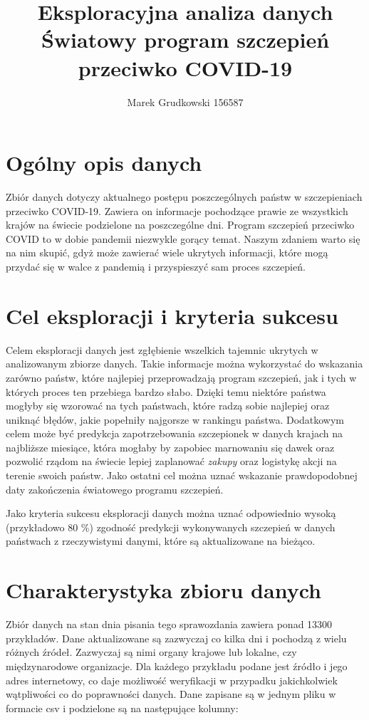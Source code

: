 \documentclass[12pt, oneside, openany]{article}
\title{
	Eksploracyjna analiza danych \\
	Światowy program szczepień przeciwko COVID-19
}
\author{
	Marek Grudkowski 156587
	\\
}
\begin{document}
\maketitle

\section{Ogólny opis danych}

Zbiór danych dotyczy aktualnego postępu poszczególnych państw w szczepieniach przeciwko COVID-19. Zawiera on informacje pochodzące prawie ze wszystkich krajów na świecie podzielone na poszczególne dni. Program szczepień przeciwko COVID to w dobie pandemii niezwykle gorący temat. Naszym zdaniem warto się na nim skupić, gdyż może zawierać wiele ukrytych informacji, które mogą przydać się w walce z pandemią i przyspieszyć sam proces szczepień. 

\section{Cel eksploracji i kryteria sukcesu}

Celem eksploracji danych jest zgłębienie wszelkich tajemnic ukrytych w analizowanym zbiorze danych. Takie informacje można wykorzystać do wskazania zarówno państw, które najlepiej przeprowadzają program szczepień, jak i tych w których proces ten przebiega bardzo słabo. Dzięki temu niektóre państwa mogłyby się wzorować na tych państwach, które radzą sobie najlepiej oraz uniknąć błędów, jakie popełniły najgorsze w rankingu państwa.  Dodatkowym celem może być predykcja zapotrzebowania szczepionek w danych krajach na najbliższe miesiące, która mogłaby by zapobiec marnowaniu się dawek oraz pozwolić rządom na świecie lepiej zaplanować \textit{zakupy} oraz logistykę akcji na terenie swoich państw.  Jako ostatni cel można uznać wskazanie prawdopodobnej daty zakończenia światowego programu szczepień. 
\par
Jako kryteria sukcesu eksploracji danych można uznać odpowiednio wysoką (przykładowo $80$ \%) zgodność predykcji wykonywanych szczepień w danych państwach z rzeczywistymi danymi, które są aktualizowane na bieżąco. 

\newpage

\section{Charakterystyka zbioru danych}
Zbiór danych na stan dnia pisania tego sprawozdania zawiera ponad 13300 przykładów. Dane aktualizowane są zazwyczaj co kilka dni i pochodzą z wielu różnych źródeł. Zazwyczaj są nimi organy krajowe lub lokalne, czy międzynarodowe organizacje. Dla każdego przykładu podane jest źródło i jego adres internetowy, co daje możliwość weryfikacji w przypadku jakichkolwiek wątpliwości co do poprawności danych. Dane zapisane są w jednym pliku w formacie csv i podzielone są na następujące kolumny:
\end{document}
